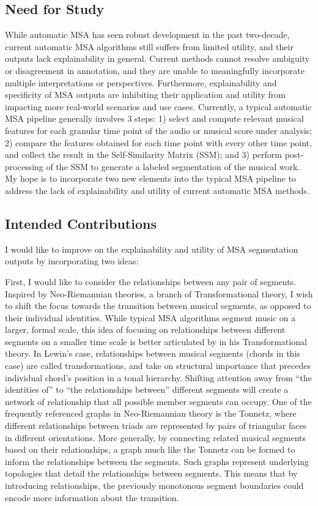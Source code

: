 \subsection{Need for Study}
While automatic MSA has seen robust development in the past two-decade, current automatic MSA algorithms still suffers from limited utility, and their outputs lack explainability in general. 
Current methods cannot resolve ambiguity or disagreement in annotation, and they are unable to meaningfully incorporate multiple interpretations or perspectives. 
Furthermore, explainability and specificity of MSA outputs are inhibiting their application and utility from impacting more real-world scenarios and use cases.
Currently, a typical automatic MSA pipeline generally involves 3 steps: 1) select and compute relevant musical features for each granular time point of the audio or musical score under analysis; 2) compare the features obtained for each time point with every other time point, and collect the result in the Self-Similarity Matrix (SSM); and 3) perform post-processing of the SSM to generate a labeled segmentation of the musical work.
My hope is to incorporate two new elements into the typical MSA pipeline to address the lack of explainability and utility of current automatic MSA methods.

\subsection{Intended Contributions}
I would like to improve on the explainability and utility of MSA segmentation outputs by incorporating two ideas:

First, I would like to consider the relationships between any pair of segments. Inspired by Neo-Riemannian theories, a branch of Transformational theory, I wish to shift the focus towards the transition between musical segments, as opposed to their individual identities. 
While typical MSA algorithms segment music on a larger, formal scale, this idea of focusing on relationships between different segments on a smaller time scale is better articulated by \cite{lewin2011generalized} in his Transformational theory. 
In Lewin’s case, relationships between musical segments (chords in this case) are called transformations, and take on structural importance that precedes individual chord's position in a tonal hierarchy. 
Shifting attention away from “the identities of” to “the relationships between” different segments will create a network of relationship that all possible member segments can occupy. 
One of the frequently referenced graphs in Neo-Riemannian theory is the Tonnetz, where different relationships between triads are represented by pairs of triangular faces in different orientations. 
More generally, by connecting related musical segments based on their relationships, a graph much like the Tonnetz can be formed to inform the relationships between the segments. 
Such graphs represent underlying topologies that detail the relationships between segments. 
This means that by introducing relationships, the previously monotonous segment boundaries could encode more information about the transition.

